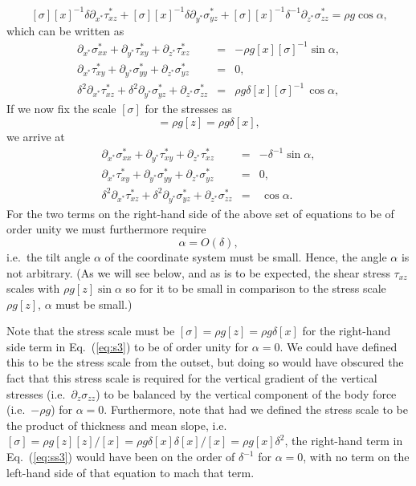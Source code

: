 \documentclass[10pt,a4paper]{book}
\newcommand{\p}{\partial}
\newcommand{\de}{\delta}
\newcommand{\txy}{\tau_{xy}}
\newcommand{\txz}{\tau_{xz}}
\newcommand{\sxx}{\sigma_{xx}}
\newcommand{\syy}{\sigma_{yy}}
\newcommand{\szz}{\sigma_{zz}}
\begin{document}
\[
\,[\sigma] [x]^{-1} \de  \p_{x^*} \txz^*+ [\sigma] [x]^{-1}\de \p_{y^*}\sigma_{yz}^* + 
[\sigma] [x]^{-1} \de^{-1} \p_{z^*} \szz^* = \rho g \cos \alpha ,
\]
which can be written as
\begin{eqnarray} 
\p_{x^*} \sxx^*+\p_{y^*} \txy^* + \p_{z^*} \txz^* &=& -\rho g [x] [\sigma]^{-1}
\sin \alpha \label{eq:s1} , \\ 
\p_{x^*} \txy^*+\p_{y^*} \syy^* + \p_{z^*} \sigma_{yz}^* &=& 0 , \label{eq:s2} \\ 
\de^2 \p_{x^*} \txz^*+ \de^2 \p_{y^*}\sigma_{yz}^* + \p_{z^*} \szz^* &=& \rho g \de [x] [\sigma]^{-1} \, \cos \alpha  ,
\label{eq:s3}
\end{eqnarray}
If we now fix the scale $[\sigma]$ for the stresses as
\begin{equation}
[\sigma]=\rho g [z] = \rho g \de [x], \label{eq:stressscale}
\end{equation}
we arrive at
\begin{eqnarray} 
\p_{x^*} \sxx^*+\p_{y^*} \txy^* + \p_{z^*} \txz^* &=& - \de^{-1} \sin \alpha \label{eq:ss1}  , \\ 
\p_{x^*} \txy^*+\p_{y^*} \syy^* + \p_{z^*} \sigma_{yz}^* &=& 0 , \label{eq:ss2} \\ 
\de^2 \p_{x^*} \txz^*+ \de^2 \p_{y^*}\sigma_{yz}^* + \p_{z^*} \szz^* &=&  \, \cos \alpha  .
\label{eq:ss3} 
\end{eqnarray}
For the two terms on the right-hand side of the above set of equations to be of order unity we must furthermore require
\[
\alpha=O(\de),
\]
i.e.\ the tilt angle $\alpha$ of the coordinate system must be
small. Hence, the angle $\alpha$ is not arbitrary. 
(As we will see below, and as is to be expected, the shear stress
$\txz$ scales with $\rho g [z] \sin \alpha$ so for it to be
small in comparison to the stress scale $\rho g [z]$, $\alpha$ must be small.)

Note that the stress scale must be $[\sigma]=\rho g [z]=\rho g \de
[x]$ for the right-hand side term in Eq.~(\ref{eq:s3}) to be of order
unity for $\alpha=0$. We could have defined this to be the stress
scale from the outset, but doing so would have obscured the fact that
this stress scale is required for the vertical gradient of the
vertical stresses (i.e.\ $\p_z \szz$) to be balanced by the
vertical component of the body force (i.e.\ $-\rho g $) for
$\alpha=0$. Furthermore, note that had we defined the stress scale to
be the product of thickness and mean slope, i.e.$[\sigma]=\rho g [z]
[z]/[x]=\rho g \de [x] \de [x]/[x]=\rho g [x] \de^2$, the right-hand
term in Eq.~(\ref{eq:ss3}) would have been on the order of $\de^{-1}$
for $\alpha=0$, with no term on the left-hand side of that equation to
mach that term.
\end{document}
